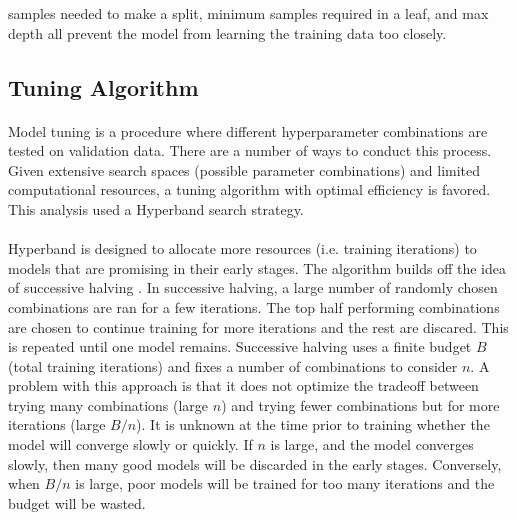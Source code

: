 \documentclass[11pt]{article}
\begin{document}
            \begin{multicols*}{2}

            
            \noindent samples needed to make a split, minimum samples required in a leaf, and max depth all prevent the model from learning the training data too closely.
            
            
        \subsection{Tuning Algorithm}
            \paragraph{}
                Model tuning is a procedure where different hyperparameter combinations are tested on validation data. 
                There are a number of ways to conduct this process.
                Given extensive search spaces (possible parameter combinations) and limited computational resources, a tuning algorithm with optimal efficiency is favored.
                This analysis used a Hyperband search strategy. 
                
            \vspace{-10pt}

            \paragraph{}
                Hyperband is designed to allocate more resources (i.e. training iterations) to models that are promising in their early stages. 
                The algorithm builds off the idea of successive halving \cite{Jameison17}.
                In successive halving, a large number of randomly chosen combinations are ran for a few iterations. 
                The top half performing combinations are chosen to continue training for more iterations and the rest are discared.
                This is repeated until one model remains. 
                Successive halving uses a finite budget $B$ (total training iterations) and fixes a number of combinations to consider $n$.
                A problem with this approach is that it does not optimize the tradeoff between trying many combinations (large $n$) and trying fewer combinations but for more iterations (large $B/n$).
                It is unknown at the time prior to training whether the model will converge slowly or quickly.
                If $n$ is large, and the model converges slowly, then many good models will be discarded in the early stages.
                Conversely, when $B/n$ is large, poor models will be trained for too many iterations and the budget will be wasted. 
                

\end{multicols*}
\end{document}
